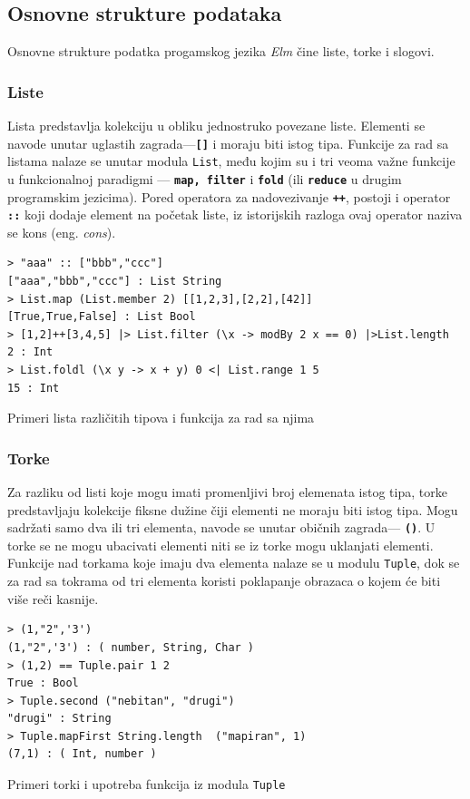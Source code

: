 \documentclass[12pt,oneside]{memoir}
\begin{document}
\subsection{Osnovne strukture podataka}
Osnovne strukture podatka progamskog jezika \emph{Elm} čine liste, torke i slogovi. 
\subsubsection{Liste}
Lista predstavlja kolekciju u obliku jednostruko povezane liste. Elementi se navode
unutar uglastih zagrada---\textbf{\texttt{[\smallskip ]}} i moraju biti istog tipa. Funkcije za rad
sa listama nalaze se unutar modula \texttt{List}, među kojim su i tri veoma važne funkcije 
u funkcionalnoj paradigmi --- \textbf{\texttt{map, filter}} i \textbf{\texttt{fold}} (ili
\textbf{\texttt{reduce}} u drugim programskim jezicima).
Pored operatora za nadovezivanje \textbf{\texttt{++}}, postoji i operator \textbf{\texttt{::}} koji
dodaje element na početak liste, iz istorijskih razloga ovaj operator naziva se kons
(eng. \emph{cons}). 
\begin{listing}[h]
\begin{verbatim}
> "aaa" :: ["bbb","ccc"]
["aaa","bbb","ccc"] : List String
> List.map (List.member 2) [[1,2,3],[2,2],[42]]
[True,True,False] : List Bool
> [1,2]++[3,4,5] |> List.filter (\x -> modBy 2 x == 0) |>List.length
2 : Int
> List.foldl (\x y -> x + y) 0 <| List.range 1 5 
15 : Int
\end{verbatim}
\caption{Primeri lista različitih tipova i funkcija za rad sa njima}
\label{listing:liste}
\end{listing}
\subsubsection{Torke}
Za razliku od listi koje mogu imati promenljivi broj elemenata istog tipa, torke
predstavljaju kolekcije fiksne dužine čiji elementi ne moraju biti istog tipa.
Mogu sadržati samo dva ili tri elementa, navode se unutar običnih zagrada---
\textbf{\texttt{()}}. U torke se ne mogu ubacivati elementi niti se iz torke mogu
uklanjati elementi. Funkcije nad torkama koje imaju dva elementa nalaze se u modulu
\texttt{Tuple}, dok se za rad sa tokrama od tri elementa koristi poklapanje obrazaca
o kojem će biti više reči kasnije.
\begin{listing}[h]
\begin{verbatim}
> (1,"2",'3')
(1,"2",'3') : ( number, String, Char )
> (1,2) == Tuple.pair 1 2
True : Bool
> Tuple.second ("nebitan", "drugi")
"drugi" : String
> Tuple.mapFirst String.length  ("mapiran", 1)
(7,1) : ( Int, number )
\end{verbatim}
\caption{Primeri torki i upotreba funkcija iz modula \texttt{Tuple}}
\label{listing:torke}
\end{listing}
\end{document}
